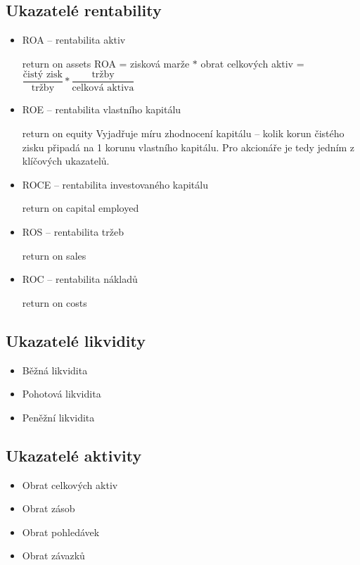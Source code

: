 \subsection{Ukazatelé rentability}
\begin{itemize}
\item{ROA -- rentabilita aktiv}

return on assets
ROA = zisková marže $*$ obrat celkových aktiv = $\dfrac{\text{čistý zisk}}{\text{tržby}} * \dfrac{\text{tržby}}{\text{celková aktiva}}$

\item{ROE -- rentabilita vlastního kapitálu}

return on equity
Vyjadřuje míru zhodnocení kapitálu -- kolik korun čistého zisku připadá na 1 korunu vlastního kapitálu. Pro akcionáře je tedy jedním z klíčových ukazatelů.

\item{ROCE -- rentabilita investovaného kapitálu}

return on capital employed

\item{ROS -- rentabilita tržeb}

return on sales

\item{ROC -- rentabilita nákladů}

return on costs
\end{itemize}


\subsection{Ukazatelé likvidity}
\begin{itemize}
\item{Běžná likvidita}
\item{Pohotová likvidita}
\item{Peněžní likvidita}
\end{itemize}


\subsection{Ukazatelé aktivity}
\begin{itemize}
\item{Obrat celkových aktiv}
\item{Obrat zásob}
\item{Obrat pohledávek}
\item{Obrat závazků}
\end{itemize}


